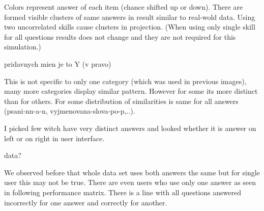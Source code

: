 \documentclass[
  digital, %
  table,   %
  nolof,     %
  nolot,     %
  nocover
]{fithesis3}
\begin{document}
Colors represent answer of each item (chance shifted up or down). There
are formed visible clusters of same answers in result similar to
real-wold data. Using two uncorrelated skills cause clusters in
projection. (When using only single skill for all questions results does
not change and they are not required for this simulation.)

pridavnych mien je to Y (v pravo)

This is not specific to only one category (which was used in previous
images), many more categories display similar pattern. However for some
its more distinct than for others. For some distribution of similarities
is same for all answers (psani-nn-a-n, vyjmenovana-slova-po-p,..).

I picked few witch have very distinct answers and looked whether it is
answer on left or on right in user interface.


data?


We observed before that whole data set uses both answers the same but
for single user this may not be true. There are even users who use only
one answer as seen in following performance matrix. There is a line with
all questions answered incorrectly for one answer and correctly for
another.
\end{document}
